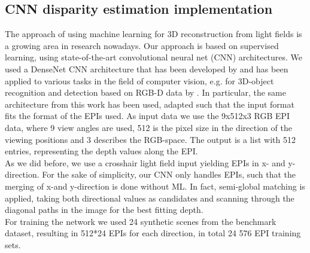 \documentclass  [
  paper    = a4,
  BCOR     = 10mm,
  twoside,
  fontsize = 12pt,
  fleqn,
  toc      = bibnumbered,
  toc      = listofnumbered,
  numbers  = noendperiod,
  headings = normal,
  listof   = leveldown,
  version  = 3.03
]                                       {scrreprt}
\begin{document}
\begin{appendix}
\chapter{CNN disparity estimation implementation}
The approach of using machine learning for 3D reconstruction from light fields is a growing area in research nowadays. Our approach is based on supervised learning, using state-of-the-art convolutional neural net (CNN) architectures.
We used a DenseNet CNN architecture that has been developed by \cite{huang2017densely} and has been applied to various tasks in the field of computer vision, e.g. for 3D-object recognition and detection based on RGB-D data by \cite{wolf2018object}. In particular, the same architecture from this work has been used, adapted such that the input format fits the format of the EPIs used. As input data we use the 9x512x3 RGB EPI data, where 9 view angles are used, 512 is the pixel size in the direction of the viewing positions and 3 describes the RGB-space. The output is a list with 512 entries, representing the depth values along the EPI. \\
As we did before, we use a crosshair light field input yielding EPIs in x- and y-direction. For the sake of simplicity, our CNN only handles EPIs, such that the merging of x-and y-direction is done without ML. In fact, semi-global matching is applied, taking both directional values as candidates and scanning through the diagonal paths in the image for the best fitting depth.\\
For training the network we used 24 synthetic scenes from the \cite{hci_benchmark} benchmark dataset, resulting in 512*24 EPIs for each direction, in total 24 576 EPI training sets.


\end{appendix}
\end{document}
